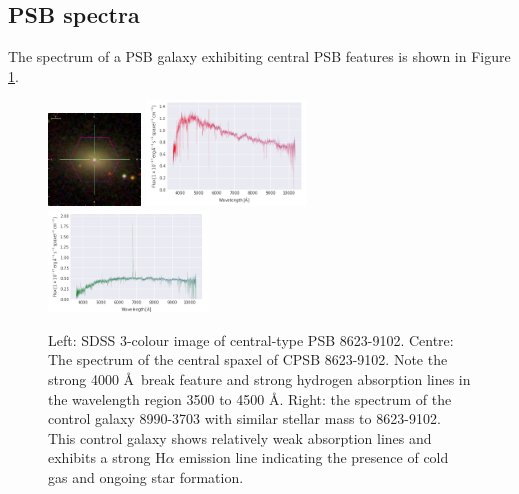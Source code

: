 \subsection{PSB spectra}
The spectrum of a PSB galaxy exhibiting central PSB features is shown in Figure \ref{fig:CPSB-8623-9102-spec}.
\begin{figure}
    \centering
    \includegraphics[width=0.22\textwidth]{images/Cutouts/CPSB-8623-9102-IM.png}
    \hfill
    \includegraphics[width=0.38\textwidth]{images/Spectra/CPSB-8623-9102.png}
    \hfill
    \includegraphics[width=0.38\textwidth]{images/Spectra/CPSB-CTRL-8990-3703-spec.png}
    \caption{Left: SDSS 3-colour image of central-type PSB 8623-9102. 
    Centre: The spectrum of the central spaxel of CPSB  8623-9102. Note the strong 4000 \AA\ break feature and strong hydrogen absorption lines in the wavelength region 3500 to 4500 \AA.
    Right: the spectrum of the control galaxy 8990-3703 with similar stellar mass to 8623-9102. This control galaxy shows relatively weak absorption lines and exhibits a strong H$\alpha$ emission line indicating the presence of cold gas and ongoing star formation.}
    \label{fig:CPSB-8623-9102-spec}
\end{figure}



